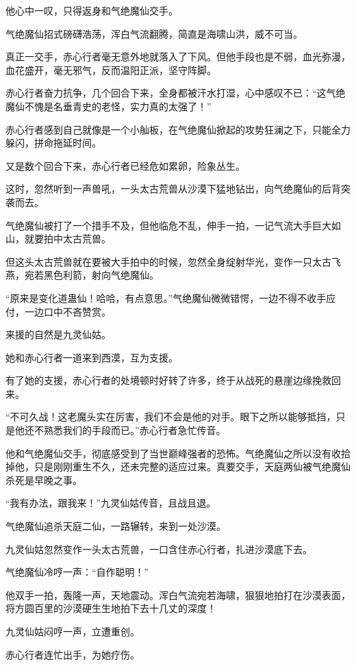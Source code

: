 \begin{this_body}
他心中一叹，只得返身和气绝魔仙交手。

气绝魔仙招式磅礴浩荡，浑白气流翻腾，简直是海啸山洪，威不可当。

真正一交手，赤心行者毫无意外地就落入了下风。但他手段也是不弱，血光弥漫，血花盛开，毫无邪气，反而温阳正派，坚守阵脚。

赤心行者奋力抗争，几个回合下来，全身都被汗水打湿，心中感叹不已：“这气绝魔仙不愧是名垂青史的老怪，实力真的太强了！”

赤心行者感到自己就像是一个小舢板，在气绝魔仙掀起的攻势狂澜之下，只能全力躲闪，拼命拖延时间。

又是数个回合下来，赤心行者已经危如累卵，险象丛生。

这时，忽然听到一声兽吼，一头太古荒兽从沙漠下猛地钻出，向气绝魔仙的后背突袭而去。

气绝魔仙被打了一个措手不及，但他临危不乱，伸手一拍，一记气流大手巨大如山，就要拍中太古荒兽。

但这头太古荒兽就在要被大手拍中的时候，忽然全身绽射华光，变作一只太古飞燕，宛若黑色利箭，射向气绝魔仙。

“原来是变化道蛊仙！哈哈，有点意思。”气绝魔仙微微错愕，一边不得不收手应付，一边口中不吝赞赏。

来援的自然是九灵仙姑。

她和赤心行者一道来到西漠，互为支援。

有了她的支援，赤心行者的处境顿时好转了许多，终于从战死的悬崖边缘挽救回来。

“不可久战！这老魔头实在厉害，我们不会是他的对手。眼下之所以能够抵挡，只是他还不熟悉我们的手段而已。”赤心行者急忙传音。

他和气绝魔仙交手，彻底感受到了当世巅峰强者的恐怖。气绝魔仙之所以没有收拾掉他，只是刚刚重生不久，还未完整的适应过来。真要交手，天庭两仙被气绝魔仙杀死是早晚之事。

“我有办法，跟我来！”九灵仙姑传音，且战且退。

气绝魔仙追杀天庭二仙，一路辗转，来到一处沙漠。

九灵仙姑忽然变作一头太古荒兽，一口含住赤心行者，扎进沙漠底下去。

气绝魔仙冷哼一声：“自作聪明！”

他双手一拍，轰隆一声，天地震动。浑白气流宛若海啸，狠狠地拍打在沙漠表面，将方圆百里的沙漠硬生生地拍下去十几丈的深度！

九灵仙姑闷哼一声，立遭重创。

赤心行者连忙出手，为她疗伤。


\end{this_body}
